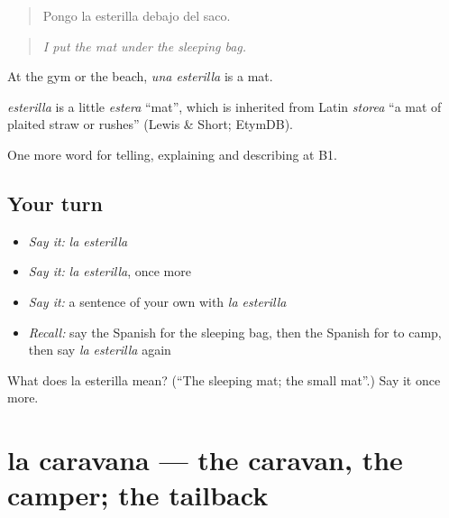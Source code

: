 \begin{quote}
Pongo la esterilla debajo del saco.
\end{quote}

\begin{quote}
\emph{I put the mat under the sleeping bag.}
\end{quote}

At the gym or the beach, \emph{una esterilla} is a mat.

\begin{cousinweb}
\emph{esterilla} is a little \emph{estera} \textquotedblleft{}mat\textquotedblright{}, which is inherited from Latin \emph{storea} \textquotedblleft{}a mat of plaited straw or rushes\textquotedblright{} (Lewis \& Short; EtymDB).
\end{cousinweb}

\begin{grammarlens}[title={What you've built}]
One more word for telling, explaining and describing at B1.
\end{grammarlens}

\subsection*{Your turn}
\begin{itemize}
\raggedright
  \item \emph{Say it:} \emph{la esterilla}
  \item \emph{Say it:} \emph{la esterilla}, once more
  \item \emph{Say it:} a sentence of your own with \emph{la esterilla}
  \item \emph{Recall:} say the Spanish for the sleeping bag, then the Spanish for to camp, then say \emph{la esterilla} again
\end{itemize}

\begin{tcolorbox}[breakable,colback=teal!4,colframe=teal!35!black,title={Before you move on}]
What does la esterilla mean? (\textquotedblleft{}The sleeping mat; the small mat\textquotedblright{}.) Say it once more.
\end{tcolorbox}
\section[la caravana]{la caravana — the caravan, the camper; the tailback}

\label{lesson:ES-C666-caravana}



